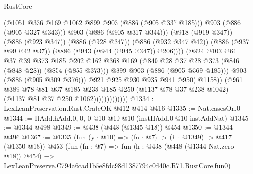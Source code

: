 \begin{lexlean}{RustCore}
\begin{coremodule}
                                          (@1051 @336 @169 @1062 @899 @903 (@886 (@905 @337 @185)))
                                          @903
                                          (@886 (@905 @327 @343)))
                                        @903
                                        (@886 (@905 @317 @344)))
                                      (@918 (@919 @347))
                                      (@886 (@923 @347))
                                      (@886 (@928 @347))
                                      (@886 (@932 @347 @42))
                                      (@886 (@937 @99 @42 @37))
                                      (@886 (@943 (@944 (@945 @347)) @206))))
                                  (@824
                                    @103
                                    @64
                                    @37
                                    @39
                                    @373
                                    @185
                                    @202
                                    @162
                                    @368
                                    @169
                                    (@840 @28 @37 @28 @373 (@846 (@848 @28)) (@854 (@855 @373)))
                                    @899
                                    @903
                                    (@886 (@905 @369 @185)))
                                  @903
                                  (@886 (@905 @309 @376)))
                                @921
                                @925
                                @930
                                @935
                                @941
                                @950)
                              @1158))
                          (@961
                            @389
                            @78
                            @81
                            @37
                            @185
                            @238
                            @185
                            @250
                            (@1137 @78 @37 @238 @1042)
                            (@1137 @81 @37 @250 @1062)))))))))))))
@1334 := LexLeanPreservation.Rust.CrateOK @412 @414 @416
@1335 := Nat.casesOn.{0}
@1344 := HAdd.hAdd.{0, 0, 0} @10 @10 @10 (instHAdd.{0} @10 instAddNat)
@1345 := @1344 @498
@1349 := @438 (@448 (@1345 @18)) @454
@1350 := @1344 @496
@1367 := @1335
    (fun (y : @10) => (fn : @7) -> (h : @1349) -> @417 (@1350 @18))
    @453
    (fun (fn : @7) =>
    fun (h : @438 (@448 (@1344 Nat.zero @18)) @454) =>
    LexLeanPreserve.C794a6cad1b5e8fdc98d1387794c0d40c.R71.RustCore.fun0)

\end{coremodule}
\end{lexlean}
